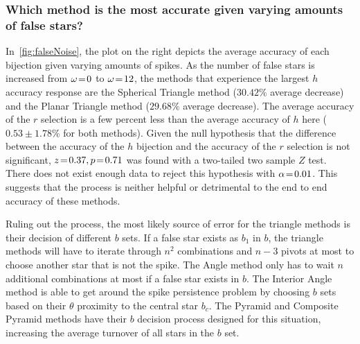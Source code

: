 \subsubsection{Which method is the most accurate given varying amounts of false stars?}
%
%
%
%
In~\autoref{fig:falseNoise}, the plot on the right depicts the average accuracy of each bijection given varying amounts
of spikes.
As the number of false stars is increased from $\omega \!=\! 0$ to $\omega \!=\! 12$, the methods that experience the largest
$h$ accuracy response are the Spherical Triangle method ($30.42\%$ average decrease) and the Planar Triangle method
($29.68\%$ average decrease).
The average accuracy of the $r$ selection is a few percent less than the average accuracy of $h$ here
($0.53\!\pm\!1.78\%$ for both methods).
Given the null hypothesis that the difference between the accuracy of the $h$ bijection and the accuracy of the $r$
selection is not significant, $z \!=\! 0.37, p \!=\! 0.71$ was found with a two-tailed two sample $Z$ test.
There does not exist enough data to reject this hypothesis with $\alpha \!=\! 0.01$.
This suggests that the  process is neither helpful or detrimental to the end to end accuracy of these
methods.

Ruling out the  process, the most likely source of error for the triangle methods is their decision of
different $b$ sets.
If a false star exists as $b_1$ in $b$, the triangle methods will have to iterate through $n^2$ combinations and $n - 3$
pivots at most to choose another star that is not the spike.
The Angle method only has to wait $n$ additional combinations at most if a false star exists in $b$.
The Interior Angle method is able to get around the spike persistence problem by choosing $b$ sets based on their
$\theta$ proximity to the central star $b_c$.
The Pyramid and Composite Pyramid methods have their $b$ decision process designed for this situation, increasing the
average turnover of all stars in the $b$ set.

